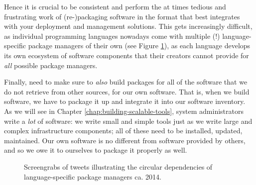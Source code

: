 Hence it is crucial to be consistent and perform the
at times tedious and frustrating work of
(re-)packaging software in the format that best
integrates with your deployment and management
solutions.  This gets increasingly difficult, as
individual programming languages nowadays come with
multiple (!) language-specific package managers of
their own (see Figure
\ref{fig:software-installation:pip-bower}), as each
language develops its own ecosystem of software
components that their creators cannot provide for {\em
all} possible package managers.

Finally, need to make sure to {\em also} build
packages for all of the software that we do not
retrieve from other sources, for our own software.
That is, when we build software, we have to package it
up and integrate it into our software inventory.  As
we will see in Chapter
\ref{chap:building-scalable-tools}, system
administrators write a {\em lot} of software: we write
small and simple tools just as we write large and
complex infrastructure components; all of these need
to be installed, updated, maintained.  Our own
software is no different from software provided by
others, and so we owe it to ourselves to package it
properly as well.

\begin{figure}[t]
	\centering
	\hspace{1em}
	\caption{Screengrabs of tweets illustrating the
		circular dependencies of language-specific package
		managers ca. 2014.\label{fig:software-installation:pip-bower}}
\end{figure}



